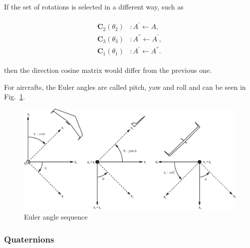 If the set of rotations is selected in a different way, such as 

\begin{align}
\label{eqn:sequence2}
\begin{split}
{\bm{C}}_2(\theta_{2}) & :      A^{'} \leftarrow A   ,
\\
{\bm{C}}_3(\theta_{3}) & :      A^{''} \leftarrow A^{'}   ,
\\
{\bm{C}}_1(\theta_{1}) & :      A^{'} \leftarrow A^{''}  .
\end{split}
\end{align}

then the direction cosine matrix would differ from the previous one.

For aircrafts, the Euler angles are called pitch, yaw and roll and can be seen in Fig.~\ref{fig:eulerAngSequence}.

\begin{landscape}
\begin{figure}
\begin{center}
\includegraphics[width=23cm]{figures/ZagiEulerAngleSequence}
\caption{Euler angle sequence \cite{ducard2009fault}} 
\label{fig:eulerAngSequence}
\end{center}
\end{figure}
\end{landscape}


\subsubsection{Quaternions}

